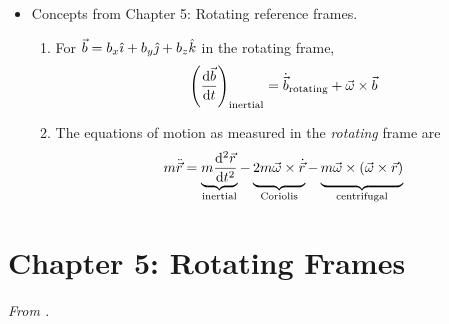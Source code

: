 \documentclass[../notes.tex]{subfiles}
\begin{document}
\begin{itemize}
\begin{enumerate}
\begin{itemize}
        \end{itemize}
    \end{enumerate}
    \item Concepts from Chapter 5: Rotating reference frames.
    \begin{enumerate}
        \item For $\vec{b}=b_x\hat{\imath}+b_y\hat{\jmath}+b_z\hat{k}$ in the rotating frame,
        \begin{equation*}
            \left( \dv{\vec{b}}{t} \right)_\text{inertial} = \dot{\vec{b}}_\text{rotating}+\vec{\omega}\times\vec{b}
        \end{equation*}
        \item The equations of motion as measured in the \emph{rotating} frame are
        \begin{equation*}
            m\ddot{\vec{r}} = \underbrace{m\dv[2]{\vec{r}}{t}}_\text{inertial}-\underbrace{2m\vec{\omega}\times\dot{\vec{r}}\vphantom{\dv[2]{\vec{r}}{t}}}_\text{Coriolis}-\underbrace{m\vec{\omega}\times(\vec{\omega}\times\vec{r})\vphantom{\dv[2]{\vec{r}}{t}}}_\text{centrifugal}
        \end{equation*}
    \end{enumerate}
\end{itemize}



\section{Chapter 5: Rotating Frames}
\emph{From \textcite{bib:KibbleBerkshire}.}
\end{document}
